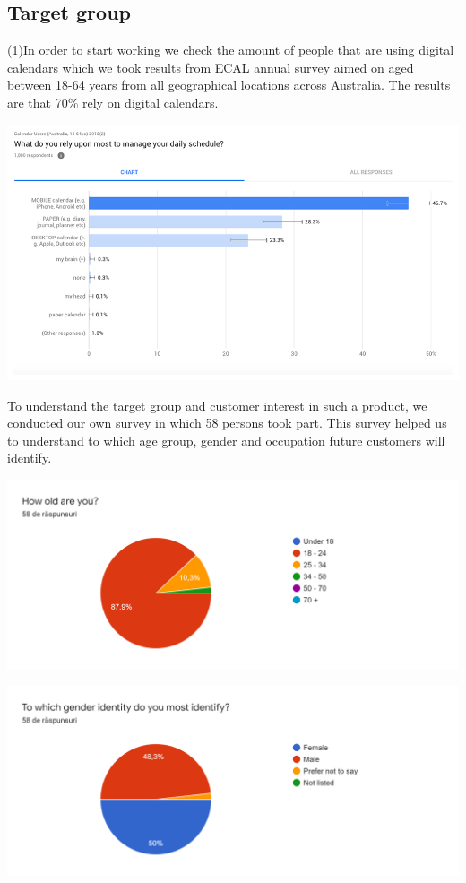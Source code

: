 \subsection{Target group}
\par (1)In order to start working we check the amount of people that are using digital calendars which we took results from ECAL annual survey aimed on aged between 18-64 years from all geographical locations across Australia. The results are that 70\% rely on digital calendars. 
\par 
\includegraphics[width=\textwidth]{General_CalendarUsage_Statistic}
\par To understand the target group and customer interest in such a product, we conducted our own survey in which 58 persons took part. This survey helped us to understand to which age group, gender and occupation future customers will identify.    
\par
\includegraphics[width=\textwidth]{TargetGroup1}
\par
\includegraphics[width=\textwidth]{TargetGroup2}
